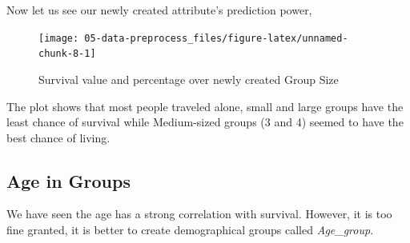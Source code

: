 \documentclass[
]{book}
\begin{document}
Now let us see our newly created attribute's prediction power,

\begin{figure}

{\centering \texttt{[image: 05-data-preprocess\_files/figure-latex/unnamed-chunk-8-1]} 

}

\caption{Survival value and percentage over newly created Group Size}\label{fig:unnamed-chunk-8}
\end{figure}

The plot shows that most people traveled alone, small and large groups have the least chance of survival while Medium-sized groups (3 and 4) seemed to have the best chance of living.

\hypertarget{age-in-groups}{%
\subsection*{Age in Groups}\label{age-in-groups}}


We have seen the age has a strong correlation with survival. However, it is too fine granted, it is better to create demographical groups called \emph{Age\_group}.
\end{document}
